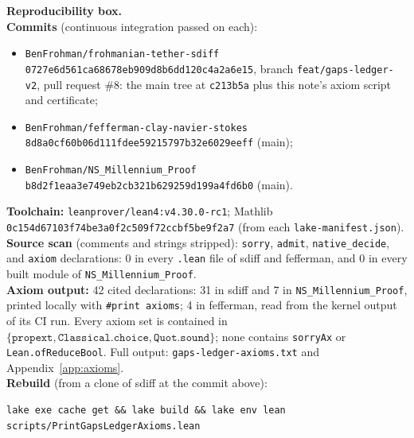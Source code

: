 \documentclass[11pt]{article}
\theoremstyle{plain}
\theoremstyle{definition}
\theoremstyle{remark}
\newcommand{\sdifffull}{0727e6d561ca68678eb909d8b6dd120c4a2a6e15}
\newcommand{\fffull}{8d8a0cf60b06d111fdee59215797b32e6029eeff}
\newcommand{\nsfull}{b8d2f1eaa3e749eb2cb321b629259d199a4fd6b0}
\begin{document}
\begin{framed}\small
\noindent\textbf{Reproducibility box.}\\[2pt]
\textbf{Commits} (continuous integration passed on each):
\begin{itemize}[leftmargin=1.2em,itemsep=0pt,topsep=2pt]
\item \texttt{BenFrohman/frohmanian-tether-sdiff} \nolinkurl{\sdifffull}, branch \texttt{feat/gaps-ledger-v2}, pull request \#8: the main tree at \texttt{c213b5a} plus this note's axiom script and certificate;
\item \texttt{BenFrohman/fefferman-clay-navier-stokes} \nolinkurl{\fffull} (main);
\item \texttt{BenFrohman/NS\_Millennium\_Proof} \nolinkurl{\nsfull} (main).
\end{itemize}
\textbf{Toolchain:} \texttt{leanprover/lean4:v4.30.0-rc1}; Mathlib \nolinkurl{0c154d67103f74be3a0f2c509f72ccbf5be9f2a7} (from each \texttt{lake-manifest.json}).\\[2pt]
\textbf{Source scan} (comments and strings stripped): \texttt{sorry}, \texttt{admit}, \texttt{native\_decide}, and \texttt{axiom} declarations: 0 in every \texttt{.lean} file of sdiff and fefferman, and 0 in every built module of \texttt{NS\_Millennium\_Proof}.\\[2pt]
\textbf{Axiom output:} 42 cited declarations: 31 in sdiff and 7 in \texttt{NS\_Millennium\_Proof}, printed locally with \texttt{\#print axioms}; 4 in fefferman, read from the kernel output of its CI run. Every axiom set is contained in \(\{\texttt{propext},\texttt{Classical.choice},\texttt{Quot.sound}\}\); none contains \texttt{sorryAx} or \texttt{Lean.ofReduceBool}. Full output: \texttt{gaps-ledger-axioms.txt} and Appendix~\ref{app:axioms}.\\[2pt]
\textbf{Rebuild} (from a clone of sdiff at the commit above):
\begin{lstlisting}
lake exe cache get && lake build && lake env lean scripts/PrintGapsLedgerAxioms.lean
\end{lstlisting}
\end{framed}
\end{document}
